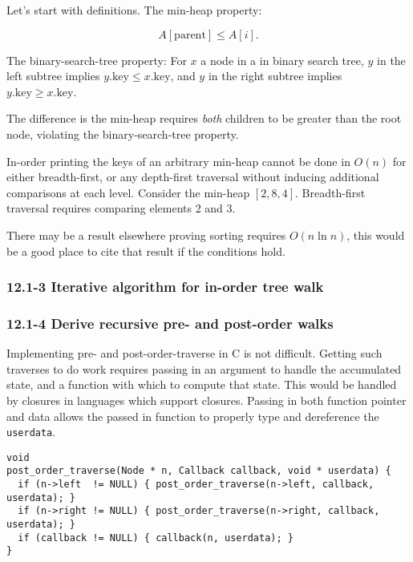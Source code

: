\documentclass{article}
\begin{document}
Let's start with definitions.
The min-heap property:

\begin{equation}
  A[\mathrm{parent}] \leq A[i].
\end{equation}

The binary-search-tree property: For $x$ a node in a in binary search tree,
$y$ in the left subtree implies $y.\mathrm{key} \leq x.\mathrm{key}$, and
$y$ in the right subtree implies $y.\mathrm{key} \geq x.\mathrm{key}$.

The difference is the min-heap requires \emph{both} children to be
greater than the root node, violating the binary-search-tree property.

In-order printing the keys of an arbitrary min-heap cannot be done in $O(n)$
for either breadth-first, or any depth-first traversal without inducing
additional comparisons at each level. Consider the min-heap $[2, 8, 4]$.
Breadth-first traversal requires comparing elements 2 and 3.

There may be a result elsewhere proving sorting requires $O(n\ln n)$,
this would be a good place to cite that result if the conditions hold.

\subsubsection{12.1-3 Iterative algorithm for in-order tree walk}

\subsubsection{12.1-4 Derive recursive pre- and post-order walks}

Implementing pre- and post-order-traverse in C is not difficult. Getting
such traverses to do work requires passing in an argument to handle
the accumulated state, and a function with which to compute that state.
This would be handled by closures in languages which support closures.
Passing in both function pointer and data allows the passed in function
to properly type and dereference the \texttt{userdata}.

\begin{lstlisting}[frame=single,title=Post-order traverse]
void
post_order_traverse(Node * n, Callback callback, void * userdata) {
  if (n->left  != NULL) { post_order_traverse(n->left, callback, userdata); }
  if (n->right != NULL) { post_order_traverse(n->right, callback, userdata); }
  if (callback != NULL) { callback(n, userdata); }
}
\end{lstlisting}
\end{document}

